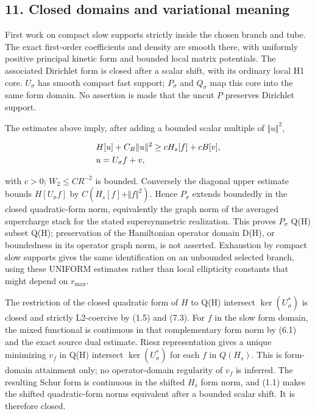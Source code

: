 \subsection{11. Closed domains and variational
meaning}\label{i-closed-domains-and-variational-meaning}

First work on compact slow supports strictly inside the chosen branch
and tube. The exact first-order coefficients and density are smooth
there, with uniformly positive principal kinetic form and bounded local
matrix potentials. The associated Dirichlet form is closed after a
scalar shift, with its ordinary local H1 core. \(U_{\sigma}\) has smooth
compact fast support; \(P_{\sigma}\) and \(Q_{\sigma}\) map this core
into the same form domain. No assertion is made that the uncut \(P\)
preserves Dirichlet support.

The estimates above imply, after adding a bounded scalar multiple of
\(\Vert u\Vert ^{2}\),

\begin{gather*}
\begin{aligned}
& H[u]+C_{R}\Vert u\Vert ^{2} \ge  c H_{s}[f]+c B[v], \\
& u=U_{\sigma} f+v,
\end{aligned}\notag
\end{gather*}

with \(c>0\); \(W_{2}\le C R^{-2}\) is bounded. Conversely the diagonal
upper estimate bounds \(H[U_{\sigma} f]\) by
\(C(H_{s}[f]+\Vert f\Vert ^{2})\). Hence \(P_{\sigma}\) extends
boundedly in the closed quadratic-form norm, equivalently the graph norm
of the averaged supercharge stack for the stated supersymmetric
realization. This proves \(P_{\sigma}\) Q(H) subset Q(H); preservation
of the Hamiltonian operator domain D(H), or boundedness in its operator
graph norm, is not asserted. Exhaustion by compact slow supports gives
the same identification on an unbounded selected branch, using these
UNIFORM estimates rather than local ellipticity constants that might
depend on \(r_{\max}\).

The restriction of the closed quadratic form of \(H\) to Q(H) intersect
\(\ker (U_{\sigma}^{*})\) is closed and strictly L2-coercive by (1.5)
and (7.3). For \(f\) in the slow form domain, the mixed functional is
continuous in that complementary form norm by (6.1) and the exact source
dual estimate. Riesz representation gives a unique minimizing \(v_{f}\)
in Q(H) intersect \(\ker (U_{\sigma}^{*})\) for each \(f\) in
\(Q(H_{s})\). This is form-domain attainment only; no operator-domain
regularity of \(v_{f}\) is inferred. The resulting Schur form is
continuous in the shifted \(H_{s}\) form norm, and (1.1) makes the
shifted quadratic-form norms equivalent after a bounded scalar shift. It
is therefore closed.

